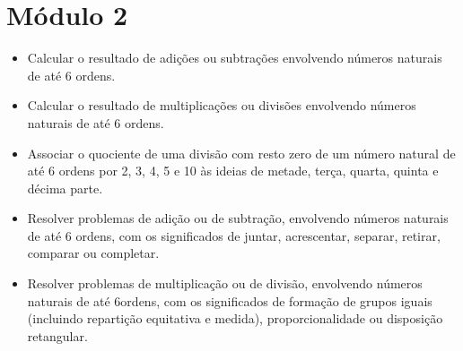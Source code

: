 \chapter{Módulo 2}


\begin{itemize}
\item Calcular o resultado de adições ou subtrações envolvendo números
naturais de até 6 ordens.

\item Calcular o resultado de multiplicações ou divisões envolvendo números
naturais de até 6 ordens.

\item Associar o quociente de uma divisão com resto zero de um número
natural de até 6 ordens por 2, 3, 4, 5 e 10 às ideias de metade, terça,
quarta, quinta e décima parte.

\item Resolver problemas de adição ou de subtração, envolvendo números
naturais de até 6 ordens, com os significados de juntar, acrescentar,
separar, retirar, comparar ou completar.

\item Resolver problemas de multiplicação ou de divisão, envolvendo números
naturais de até 6ordens, com os significados de formação de grupos
iguais (incluindo repartição equitativa e medida), proporcionalidade ou
disposição retangular.
\end{itemize}



